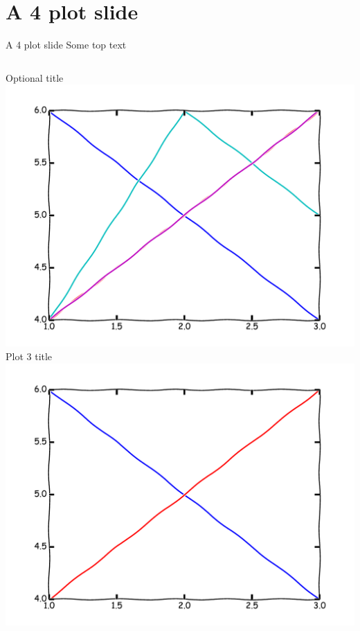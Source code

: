 
\section{A 4 plot slide}
\begin{frame}{A 4 plot slide}
Some top text
\begin{columns}
\begin{column}{0.4\textwidth}
\begin{center}
Optional title
\\
\includegraphics[width=\textwidth]{example/plot1.pdf}
\\
Plot 3 title
\\
\includegraphics[width=\textwidth]{example/plot3.pdf}
\\
\end{center}
\end{column}


\end{columns}
\end{frame}
